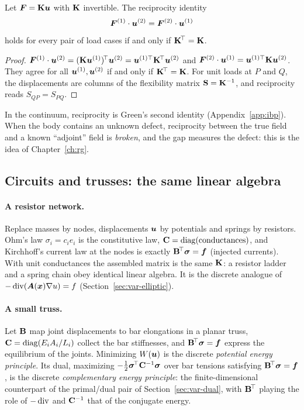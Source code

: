 \begin{proposition}\label{prop:reciprocity}
%
Let $\bm{F}=\mathbf{K}\bm{u}$ with $\mathbf{K}$ invertible. The reciprocity identity
\[
  \bm{F}^{(1)}\cdot\bm{u}^{(2)}=\bm{F}^{(2)}\cdot\bm{u}^{(1)}
\]
holds for every pair of load cases if and only if $\mathbf{K}^{\!\top}=\mathbf{K}$.
\end{proposition}
\begin{proof}
$\bm{F}^{(1)}\cdot\bm{u}^{(2)}=(\mathbf{K}\bm{u}^{(1)})^{\!\top}\bm{u}^{(2)}=\bm{u}^{(1)\top}\mathbf{K}^{\!\top}\bm{u}^{(2)}$
and $\bm{F}^{(2)}\cdot\bm{u}^{(1)}=\bm{u}^{(1)\top}\mathbf{K}\bm{u}^{(2)}$. They agree for all
$\bm{u}^{(1)},\bm{u}^{(2)}$ if and only if $\mathbf{K}^{\!\top}=\mathbf{K}$. For unit loads at $P$
and $Q$, the displacements are columns of the flexibility matrix
$\mathbf{S}=\mathbf{K}^{-1}$, and reciprocity reads $S_{QP}=S_{PQ}$.
\end{proof}
In the continuum, reciprocity is Green's second identity
(Appendix~\ref{app:ibp}). When the body contains an unknown defect,
reciprocity between the true field and a known ``adjoint'' field is
\emph{broken}, and the gap measures the defect: this is the idea of
Chapter~\ref{ch:rg}.

\subsection{Circuits and trusses: the same linear algebra}
\paragraph{A resistor network.} Replace masses by nodes, displacements $\bm{u}$ by
%
potentials and springs by resistors. Ohm's law $\sigma_i=c_ie_i$ is the
constitutive law, $\mathbf{C}=\operatorname{diag}(\text{conductances})$, and Kirchhoff's current
law at the nodes is exactly $\mathbf{B}^{\!\top}\bm{\sigma}=\bm{f}$ (injected currents).
With unit conductances the assembled matrix is the same $\mathbf{K}$: a resistor
ladder and a spring chain obey identical linear algebra. It is the discrete
analogue of $-\operatorname{div}(\bm{A}(\bm{x})\nabla u)=f$ (Section~\ref{sec:var-elliptic}).

\paragraph{A small truss.} Let $\mathbf{B}$ map joint displacements to bar
%
elongations in a planar truss, $\mathbf{C}=\operatorname{diag}(E_iA_i/L_i)$ collect the bar
stiffnesses, and $\mathbf{B}^{\!\top}\bm{\sigma}=\bm{f}$ express the equilibrium of the
joints. Minimizing $W(\bm{u})$ is the discrete \emph{potential energy principle}.
Its dual, maximizing $-\tfrac12\bm{\sigma}^{\!\top}\mathbf{C}^{-1}\bm{\sigma}$ over bar
tensions satisfying $\mathbf{B}^{\!\top}\bm{\sigma}=\bm{f}$, is the discrete
\emph{complementary energy principle}: the finite-dimensional counterpart of
the primal/dual pair of Section~\ref{sec:var-dual}, with $\mathbf{B}^{\!\top}$ playing
the role of $-\operatorname{div}$ and $\mathbf{C}^{-1}$ that of the conjugate energy.

